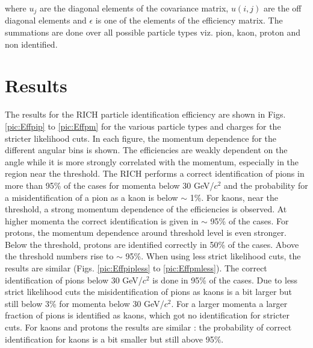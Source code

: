 where $u_j$ are the diagonal elements of the covariance matrix, $u(i,j)$ are the off diagonal elements and $\epsilon$ is one of the elements of the efficiency matrix. The summations are done over all possible particle types viz. pion, kaon, proton and non identified.

\section{Results} \label{sec:Results}

The results for the RICH particle identification efficiency are shown in Figs. \ref{pic:Effpip} to \ref{pic:Effpm} for the various particle types and charges for the stricter likelihood cuts. In each figure, the momentum dependence for the different angular bins is shown. The efficiencies are weakly dependent on the angle while it is more strongly correlated with the momentum, especially in the region near the threshold.
The RICH performs a correct identification of pions in more than 95\% of the cases for momenta below 30 GeV/$c^2$ and the probability for a misidentification of a pion as a kaon is below $\sim$ 1\%. For kaons, near the threshold, a strong momentum dependence of the efficiencies is observed. At higher momenta the correct identification is given in $\sim$ 95\% of the cases. For protons, the momentum dependence around threshold level is even stronger. Below the threshold, protons are identified correctly in 50\% of the cases. Above the threshold numbers rise to $\sim$ 95\%. When using less strict likelihood cuts, the results are similar (Figs. \ref{pic:Effpipless} to \ref{pic:Effpmless}). The correct identification of pions below 30 GeV/$c^2$ is done in 95\% of the cases. Due to less strict likelihood cuts the misidentification of pions as kaons is a bit larger but still below 3\% for momenta below 30 GeV/$c^2$. For a larger momenta a larger fraction of pions is identified as kaons, which got no identification for stricter cuts. For kaons and protons the results are similar : the probability of correct identification for kaons is a bit smaller but still above 95\%.

